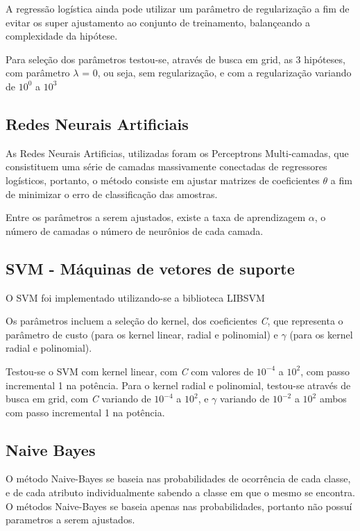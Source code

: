 A regressão logística ainda pode utilizar um parâmetro de regularização a fim de evitar os super ajustamento ao conjunto de treinamento, balançeando a complexidade da hipótese.

Para seleção dos parâmetros testou-se, através de busca em grid, as 3 hipóteses, com parâmetro \(\lambda\) = 0, ou seja, sem regularização, e com a regularização variando de \(10^0\) a \(10^3\) 

\subsection{Redes Neurais Artificiais}

As Redes Neurais Artificias, utilizadas foram os Perceptrons Multi-camadas, que consistituem uma série de camadas massivamente conectadas de regressores logísticos, portanto, o método consiste em ajustar matrizes de coeficientes \(\theta\) a fim de minimizar o erro de classificação das amostras.

Entre os parâmetros a serem ajustados, existe a taxa de aprendizagem \(\alpha\), o número de camadas o número de neurônios de cada camada.

\subsection{SVM - Máquinas de vetores de suporte}

O SVM foi implementado utilizando-se a biblioteca LIBSVM \cite{libsvm}

Os parâmetros incluem a seleção do kernel, dos coeficientes \emph{C}, que representa o parâmetro de custo (para os kernel linear, radial e polinomial) e \(\gamma\) (para os kernel radial e polinomial).

Testou-se o SVM com kernel linear, com \emph{C} com valores de \(10^{-4}\) a \(10^2\), com passo incremental 1 na potência. Para o kernel radial e polinomial, testou-se através de busca em grid, com \emph{C} variando de \(10^{-4}\) a \(10^2\), e \(\gamma\) variando de \(10^{-2}\) a \(10^2\) ambos com passo incremental 1 na potência.


\subsection{Naive Bayes}

O método Naive-Bayes se baseia nas probabilidades de ocorrência de cada classe, e de cada atributo individualmente sabendo a classe em que o mesmo se encontra. O métodos Naive-Bayes se baseia apenas nas probabilidades, portanto não possuí parametros a serem ajustados.

